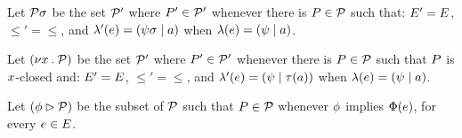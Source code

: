 \begin{definition}
  Let $\mathcal{P}\sigma$ be the set $\mathcal{P}'$ where $P'\in\mathcal{P}'$ whenever
there is $P\in\mathcal{P}$ such that:
$E' = E$,
${\le'} = {\le}$, 
and
$\lambda'(e) = (\psi\sigma \mid a)$ when $\lambda(e) = (\psi \mid a)$.


Let $(\nu x\mathbin.\mathcal{P})$ be the set $\mathcal{P}'$ where $P'\in\mathcal{P}'$ whenever
there is $P\in\mathcal{P}$ such that $P$ is $x$-closed and:
$E' = E$,
${\le'} = {\le}$, 
and
$\lambda'(e) = (\psi \mid \tau(a))$ when $\lambda(e) = (\psi \mid a)$.

Let $(\phi \mathbin\rhd \mathcal{P})$ be the subset of $\mathcal{P}$ such that $P\in\mathcal{P}$ whenever
$\phi$ implies $\Phi(e)$, for every $e\in E$. %

%
\end{definition}




